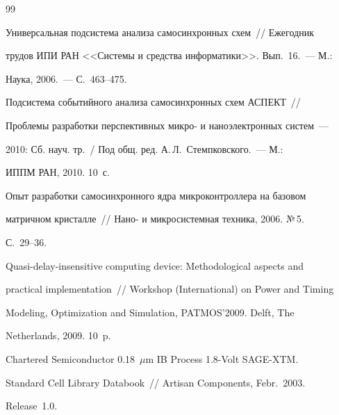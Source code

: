 {\begin{thebibliography}{99}




   Универсальная подсистема анализа самосинхронных схем~// Ежегодник


трудов ИПИ РАН <<Системы и средства информатики>>. Вып.~16.~--- М.:


Наука, 2006.~--- С.~463--475.









   Подсистема событийного анализа самосинхронных схем АСПЕКТ~//


Проблемы разработки перспективных микро- и на\-но\-электронных систем~--- 


2010: Сб. науч. тр.~/ Под общ. ред. А.\,Л.~Стемпковского.~--- М.:


ИППМ РАН, 2010. 10~с. 









   Опыт разработки самосинхронного ядра микроконтроллера на базовом


мат\-рич\-ном кристалле~// Нано- и микросистемная техника, 2006. №\,5.


С.~29--36.









   Quasi-delay-insensitive computing device: Methodological aspects and


practical implementation~//  Workshop (International) on Power and Timing


Modeling, Optimization and Simulation, PATMOS'2009. Delft, The


Netherlands, 2009. 10~p.







Chartered Semiconductor 0.18~$\mu$m IB Process 1.8-Volt SAGE-XTM.


Standard Cell Library Databook~// Artisan Components, Febr.\ 2003.


Release~1.0.


\end{thebibliography}


}


